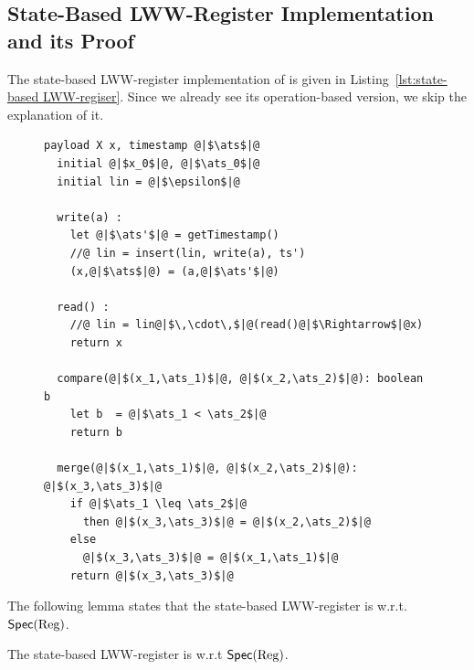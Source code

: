 \subsection{State-Based LWW-Register Implementation and its Proof}
\label{subsec:state-based LWW-register implementation and its proof}

The state-based LWW-register implementation of \cite{ShapiroPBZ11} is given in Listing~\ref{lst:state-based LWW-regiser}. Since we already see its operation-based version, we skip the explanation of it.

\begin{figure}[t]
\begin{lstlisting}[frame=top,caption={Pseudo-code of state-based LWW-register},
captionpos=b,label={lst:state-based LWW-regiser}]
  payload X x, timestamp @|$\ats$|@
  initial @|$x_0$|@, @|$\ats_0$|@
  initial lin = @|$\epsilon$|@

  write(a) :
    let @|$\ats'$|@ = getTimestamp()
    //@ lin = insert(lin, write(a), ts')
    (x,@|$\ats$|@) = (a,@|$\ats'$|@)

  read() :
    //@ lin = lin@|$\,\cdot\,$|@(read()@|$\Rightarrow$|@x)
    return x

  compare(@|$(x_1,\ats_1)$|@, @|$(x_2,\ats_2)$|@): boolean b
    let b  = @|$\ats_1 < \ats_2$|@
    return b

  merge(@|$(x_1,\ats_1)$|@, @|$(x_2,\ats_2)$|@): @|$(x_3,\ats_3)$|@
    if @|$\ats_1 \leq \ats_2$|@
      then @|$(x_3,\ats_3)$|@ = @|$(x_2,\ats_2)$|@
    else
      @|$(x_3,\ats_3)$|@ = @|$(x_1,\ats_1)$|@
    return @|$(x_3,\ats_3)$|@
\end{lstlisting}
\end{figure}



The following lemma states that the state-based LWW-register is \crdtlinearizable{} w.r.t. $\mathsf{Spec}(\text{Reg})$.

\begin{lemma}
\label{lemma:state-based LWW-register is correct}
The state-based LWW-register is \crdtlinearizable{} w.r.t $\mathsf{Spec}(\text{Reg})$.
\end{lemma}

